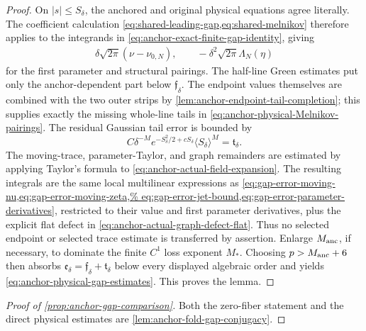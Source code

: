 \begin{proof}
On \(|s|\le S_\delta\), the anchored and original physical equations agree
literally.  The coefficient calculation
\cref{eq:shared-leading-gap,eq:shared-melnikov} therefore applies to the
integrands in \cref{eq:anchor-exact-finite-gap-identity}, giving
\begin{align}
 \delta\sqrt{2\pi}(\nu-\nu_{0,N}),\qquad
 -\delta^2\sqrt{2\pi}\Lambda_N(\eta)               \label{eq:anchor-physical-Melnikov-pairings}
\end{align}
for the first parameter and structural pairings.  The half-line Green
estimates put only the anchor-dependent part below
\(\mathfrak f_\delta\).  The endpoint values themselves are combined with
the two outer strips by
\cref{lem:anchor-endpoint-tail-completion}; this supplies exactly the
missing whole-line tails in
\cref{eq:anchor-physical-Melnikov-pairings}.  The residual Gaussian
tail error is bounded by
\begin{equation}
 C\delta^{-M}e^{-S_\delta^2/2+cS_\delta}
       \langle S_\delta\rangle^M=\mathfrak t_\delta.           \label{eq:anchor-physical-tail-bound}
\end{equation}
The moving-trace, parameter-Taylor, and graph remainders are estimated by
applying Taylor's formula to
\cref{eq:anchor-actual-field-expansion}.  The resulting integrals are the
same local multilinear expressions as
\cref{eq:gap-error-moving-nu,eq:gap-error-moving-zeta,%
eq:gap-error-jet-bound,eq:gap-error-parameter-derivatives}, restricted to
their value and first parameter derivatives, plus the
explicit flat defect in \cref{eq:anchor-actual-graph-defect-flat}.  Thus no
selected endpoint or selected trace estimate is transferred by assertion.
Enlarge \(M_{\rm anc}\), if necessary, to dominate the finite \(C^1\)
loss exponent \(M_*\).  Choosing \(p>M_{\rm anc}+6\) then absorbs
\(\mathfrak e_\delta=\mathfrak f_\delta+\mathfrak t_\delta\) below every
displayed algebraic order and yields
\cref{eq:anchor-physical-gap-estimates}.
This proves the lemma.
\end{proof}

\begin{proof}[Proof of \cref{prop:anchor-gap-comparison}]
Both the zero-fiber statement and the direct physical estimates are
\cref{lem:anchor-fold-gap-conjugacy}.
\end{proof}

